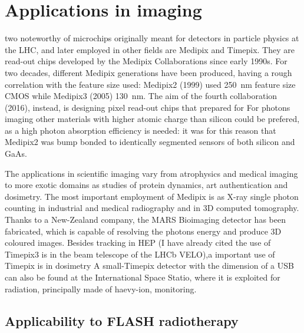 \section{Applications in imaging}
     two noteworthy of microchips originally meant for detectors in particle physics at the LHC, and later employed in other fields are Medipix and Timepix. They are read-out chips developed by the Medipix Collaborations since early 1990s. For two decades, different Medipix generations have been produced, having a rough correlation with the feature size used: Medipix2 (1999) used \SI{250}{nm} feature size CMOS while Medipix3 (2005) \SI{130}{nm}.
    The aim of the fourth collaboration (2016), instead, is designing pixel read-out chips that prepared for 
    For photons imaging other materials with higher atomic charge than silicon could be prefered, as a high photon absorption efficiency is needed: it was for this reason that Medipix2 was bump bonded to identically segmented sensors of both silicon and GaAs.
    
    The applications in scientific imaging vary from atrophysics and medical imaging to more exotic domains as studies of protein dynamics, art authentication and dosimetry.
    The most important employment of Medipix is as X-ray single photon counting in industrial and medical radiography and in 3D computed tomography. 
    Thanks to a New-Zealand company, the MARS Bioimaging detector has been fabricated, which is capable of resolving the photons energy and produce 3D coloured images.
    Besides tracking in HEP (I have already cited the use of Timepix3 is in the beam telescope of the LHCb VELO),a important use of Timepix is in dosimetry 
    A small-Timepix detector with the dimension of a USB can also be found at the International Space Statio, where it is exploited for radiation, principally made of haevy-ion, monitoring. 
 
    \subsection{Applicability to FLASH radiotherapy}

